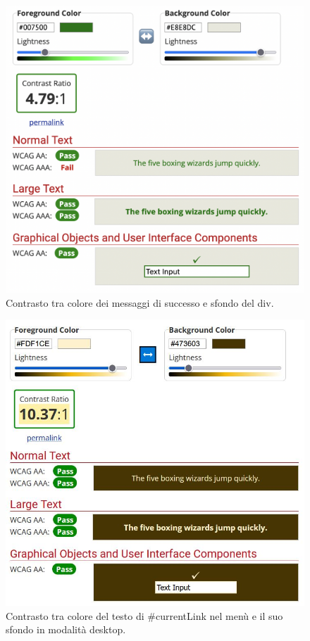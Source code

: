\documentclass[a4paper]{article}
\begin{document}
	\begin{figure}[H]
		\centering
		\includegraphics[scale=0.3]{immagini/controllo-colori/light-mode/successo_sfondo-div.png}
		\caption{Contrasto tra colore dei messaggi di successo e sfondo del div.}
	\end{figure}

	\begin{figure}[H]
		\centering
		\includegraphics[scale=0.35]{immagini/controllo-colori/light-mode/testo-contrasto-sfondi_testo-principale.JPG}
		\caption{Contrasto tra colore del testo di \#currentLink nel menù e il suo sfondo in modalità desktop.}
	\end{figure}
\end{document}
